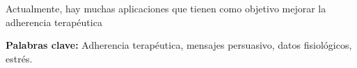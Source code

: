 \begin{resumen}
Actualmente, hay muchas aplicaciones que tienen como objetivo mejorar la adherencia terapéutica 

\begin{flushleft}
\textbf{Palabras clave:} Adherencia terapéutica, mensajes persuasivo, datos fisiológicos, estrés.
\end{flushleft}

\end{resumen}

